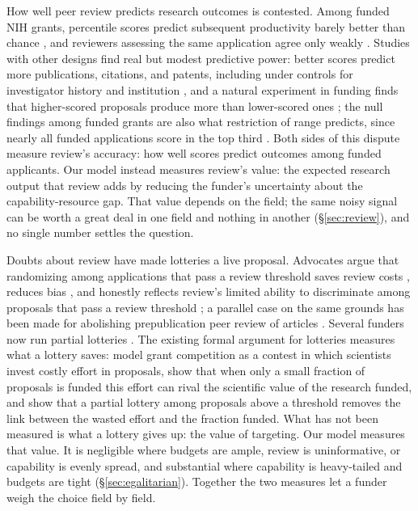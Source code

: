 \documentclass[article, 11pt, reqno]{amsart}
\theoremstyle{named}
\begin{document}
How well peer review predicts research outcomes is contested. Among funded NIH grants, percentile scores predict subsequent productivity barely better than chance \citep{Fang2016}, and reviewers assessing the same application agree only weakly \citep{Pier2018}. Studies with other designs find real but modest predictive power: better scores predict more publications, citations, and patents, including under controls for investigator history and institution \citep{LiAgha2015}, and a natural experiment in funding finds that higher-scored proposals produce more than lower-scored ones \citep{ParkLeeKim2015}; the null findings among funded grants are also what restriction of range predicts, since nearly all funded applications score in the top third \citep{LindnerNakamura2015}. Both sides of this dispute measure review's accuracy: how well scores predict outcomes among funded applicants. Our model instead measures review's value: the expected research output that review adds by reducing the funder's uncertainty about the capability-resource gap. That value depends on the field; the same noisy signal can be worth a great deal in one field and nothing in another (\S\ref{sec:review}), and no single number settles the question.

Doubts about review have made lotteries a live proposal. Advocates argue that randomizing among applications that pass a review threshold saves review costs \citep{Herbert2013}, reduces bias \citep{Ginther2011, Witteman2019, Boudreau2016}, and honestly reflects review's limited ability to discriminate among proposals that pass a review threshold \citep{Pier2018, FangCasadevall2016, Avin2019, Roumbanis2019, Shaw2023}; a parallel case on the same grounds has been made for abolishing prepublication peer review of articles \citep{HeesenBright2021}. Several funders now run partial lotteries \citep{Liu2020, Heyard2022, Luebber2025}. The existing formal argument for lotteries measures what a lottery saves: \citet{GrossBergstrom2019} model grant competition as a contest in which scientists invest costly effort in proposals, show that when only a small fraction of proposals is funded this effort can rival the scientific value of the research funded, and show that a partial lottery among proposals above a threshold removes the link between the wasted effort and the fraction funded. What has not been measured is what a lottery gives up: the value of targeting. Our model measures that value. It is negligible where budgets are ample, review is uninformative, or capability is evenly spread, and substantial where capability is heavy-tailed and budgets are tight (\S\ref{sec:egalitarian}). Together the two measures let a funder weigh the choice field by field.
\end{document}
